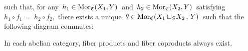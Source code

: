 \begin{definition}
\begin{enumerate}
	such that, for any
	\,$h_{1} \in \textnormal{Mor}_{\mathfrak{C}}(X_{1},Y)$\,
	and
	\,$h_{2} \in \textnormal{Mor}_{\mathfrak{C}}(X_{2},Y)$\,
	satisfying
	\,$h_{1} \circ f_{1} \,=\, h_{2} \circ f_{2}$,\,
	there exists a unique
	\,$\theta \in \textnormal{Mor}_{\mathfrak{C}}(X_{1}\sqcup_{S}\!X_{2}\,,\,Y)$\,
	such that the following diagram commutes:
	\begin{center}
	\end{center}
\end{enumerate}
\end{definition}


\vskip 0.5cm
\begin{proposition}
\label{FiberProductFiberCoproductExistInAbelianCategories}
\mbox{}
\vskip 0.1cm
\noindent
In each abelian category,
fiber products and fiber coproducts always exist.
\end{proposition}
\proof

